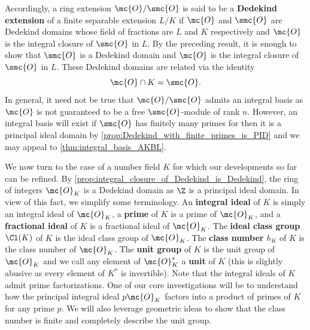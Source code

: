     Accordingly, a ring extension \(\mc{O}/\smc{O}\) is said to be a \textbf{Dedekind extension} of a finite separable extension \(L/K\) if \(\mc{O}\) and \(\smc{O}\) are Dedekind domains whose field of fractions are \(L\) and \(K\) respectively and \(\mc{O}\) is the integral closure of \(\smc{O}\) in \(L\). By the preceding result, it is enough to show that \(\smc{O}\) is a Dedekind domain and \(\mc{O}\) is the integral closure of \(\smc{O}\) in \(L\). These Dedekind domains are related via the identity
    \begin{equation}\label{equ:Dedekind_extension_intersection}
      \mc{O} \cap K = \smc{O}.
    \end{equation}
    In general, it need not be true that \(\mc{O}/\smc{O}\) admits an integral basis as \(\mc{O}\) is not guaranteed to be a free \(\smc{O}\)-module of rank \(n\). However, an integral basis will exist if \(\smc{O}\) has finitely many primes for then it is a principal ideal domain by \cref{prop:Dedekind_with_finite_primes_is_PID} and we may appeal to \cref{thm:integral_basis_AKBL}.

    We now turn to the case of a number field \(K\) for which our developments so far can be refined. By \cref{prop:integral_closure_of_Dedekind_is_Dedekind}, the ring of integers \(\mc{O}_{K}\) is a Dedekind domain as \(\Z\) is a principal ideal domain. In view of this fact, we simplify some terminology. An \textbf{integral ideal} of \(K\) is simply an integral ideal of \(\mc{O}_{K}\), a \textbf{prime} of \(K\) is a prime of \(\mc{O}_{K}\), and a \textbf{fractional ideal} of \(K\) is a fractional ideal of \(\mc{O}_{K}\). The \textbf{ideal class group} \(\Cl(K)\) of \(K\) is the ideal class group of \(\mc{O}_{K}\). The \textbf{class number} \(h_{K}\) of \(K\) is the class number of \(\mc{O}_{K}\). The \textbf{unit group} of \(K\) is the unit group of \(\mc{O}_{K}\) and we call any element of \(\mc{O}_{K}^{\ast}\) a \textbf{unit} of \(K\) (this is slightly abusive as every element of \(K^{\ast}\) is invertible). Note that the integral ideals of \(K\) admit prime factorizations. One of our core investigations will be to understand how the principal integral ideal \(p\mc{O}_{K}\) factors into a product of primes of \(K\) for any prime \(p\). We will also leverage geometric ideas to show that the class number is finite and completely describe the unit group.

